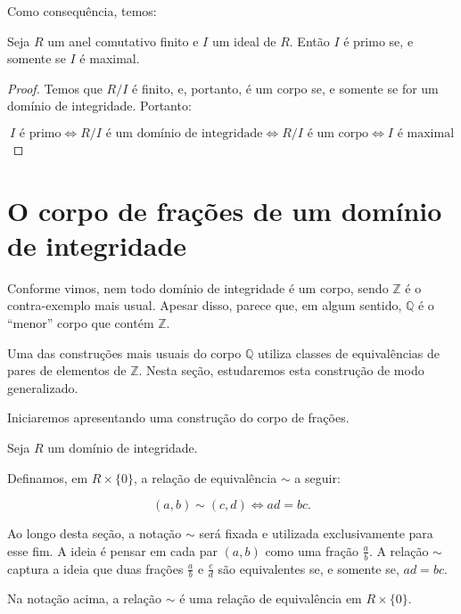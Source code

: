 Como consequência, temos:

\begin{corol}
    Seja $R$ um anel comutativo finito e $I$ um ideal de $R$. Então $I$ é primo se, e somente se $I$ é maximal.
\end{corol}
\begin{proof}
    Temos que $R/I$ é finito, e, portanto, é um corpo se, e somente se for um domínio de integridade.
    Portanto:

    \[I \text{ é primo} \Leftrightarrow R/I \text{ é um domínio de integridade} \Leftrightarrow R/I \text{ é um corpo} \Leftrightarrow I \text{ é maximal}\]
\end{proof}

\section{O corpo de frações de um domínio de integridade}

Conforme vimos, nem todo domínio de integridade é um corpo, sendo $\mathbb Z$ é o contra-exemplo mais usual.
Apesar disso, parece que, em algum sentido, $\mathbb Q$ é o ``menor'' corpo que contém $\mathbb Z$.

Uma das construções mais usuais do corpo $\mathbb Q$ utiliza classes de equivalências de pares de elementos de $\mathbb Z$.
Nesta seção, estudaremos esta construção de modo generalizado.

Iniciaremos apresentando uma construção do corpo de frações.

\begin{definition}
    Seja $R$ um domínio de integridade.

    Definamos, em $R\times \{0\}$, a relação de equivalência $\sim$ a seguir:

    \[(a, b) \sim (c, d) \Leftrightarrow ad=bc.\]
\end{definition}

Ao longo desta seção, a notação $\sim$ será fixada e utilizada exclusivamente para esse fim.
A ideia é pensar em cada par $(a, b)$ como uma fração $\frac{a}{b}$.
A relação $\sim$ captura a ideia que duas frações $\frac{a}{b}$ e $\frac{c}{d}$ são equivalentes se, e somente se, $ad=bc$.

\begin{lemma}
    Na notação acima, a relação $\sim$ é uma relação de equivalência em $R\times \{0\}$.
\end{lemma}

